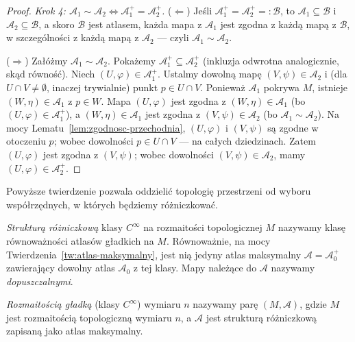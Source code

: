 \begin{proof}
\emph{Krok 4: $\mathcal A_1\sim\mathcal A_2\iff\mathcal A_1^+=\mathcal A_2^+$.}
($\Leftarrow$) Jeśli $\mathcal A_1^+=\mathcal A_2^+=:\mathcal B$, to $\mathcal A_1\subseteq
\mathcal B$ i $\mathcal A_2\subseteq\mathcal B$, a skoro $\mathcal B$ jest atlasem, każda
mapa z $\mathcal A_1$ jest zgodna z każdą mapą z $\mathcal B$, w szczególności z każdą mapą
z $\mathcal A_2$ — czyli $\mathcal A_1\sim\mathcal A_2$.

($\Rightarrow$) Załóżmy $\mathcal A_1\sim\mathcal A_2$. Pokażemy $\mathcal A_1^+\subseteq
\mathcal A_2^+$ (inkluzja odwrotna analogicznie, skąd równość). Niech $(U,\varphi)\in
\mathcal A_1^+$. Ustalmy dowolną mapę $(V,\psi)\in\mathcal A_2$ i (dla $U\cap V\neq
\emptyset$, inaczej trywialnie) punkt $p\in U\cap V$. Ponieważ $\mathcal A_1$ pokrywa $M$,
istnieje $(W,\eta)\in\mathcal A_1$ z $p\in W$. Mapa $(U,\varphi)$ jest zgodna z $(W,\eta)\in
\mathcal A_1$ (bo $(U,\varphi)\in\mathcal A_1^+$), a $(W,\eta)\in\mathcal A_1$ jest zgodna z
$(V,\psi)\in\mathcal A_2$ (bo $\mathcal A_1\sim\mathcal A_2$). Na mocy
Lematu~\ref{lem:zgodnosc-przechodnia}, $(U,\varphi)$ i $(V,\psi)$ są zgodne w otoczeniu
$p$; wobec dowolności $p\in U\cap V$ — na całych dziedzinach. Zatem $(U,\varphi)$ jest
zgodna z $(V,\psi)$; wobec dowolności $(V,\psi)\in\mathcal A_2$, mamy $(U,\varphi)\in
\mathcal A_2^+$.
\end{proof}

Powyższe twierdzenie pozwala oddzielić topologię przestrzeni od
wyboru współrzędnych, w których będziemy różniczkować.

\begin{definicja}\label{def:struktura-rozniczkowa}
\emph{Strukturą różniczkową} klasy $C^\infty$ na rozmaitości
topologicznej $M$ nazywamy klasę równoważności atlasów gładkich
na $M$. Równoważnie, na mocy Twierdzenia~\ref{tw:atlas-maksymalny},
jest nią jedyny atlas maksymalny $\mathcal A=\mathcal A_0^+$
zawierający dowolny atlas $\mathcal A_0$ z tej klasy. Mapy
należące do $\mathcal A$ nazywamy \emph{dopuszczalnymi}.
\end{definicja}

\begin{definicja}\label{def:rozmaitosc-gladka}
\emph{Rozmaitością gładką} (klasy $C^\infty$) wymiaru $n$
nazywamy parę $(M,\mathcal A)$, gdzie $M$ jest rozmaitością
topologiczną wymiaru $n$, a $\mathcal A$ jest strukturą
różniczkową zapisaną jako atlas maksymalny.
\end{definicja}

